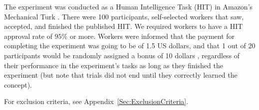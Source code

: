 The experiment was conducted as a Human Intelligence Task (HIT) in Amazon's Mechanical Turk \cite{crump2013evaluating, buhrmester2011amazon, stewart2015average}. %
There were 100 participants,  self-selected workers that saw, accepted, and finished the published HIT. We required workers to have a HIT approval rate of $95\%$ or more. %
Workers were informed that the payment for completing the experiment was going to be of {1.5} US dollars, 
and that 1 out of 20 participants would be randomly assigned a bonus of 10 dollars%
, regardless of their performance in the experiment's tasks %
as long as they finished the experiment (but note that trials did not end until they correctly learned the concept). %

For exclusion criteria, see Appendix~\ref{Sec:ExclusionCriteria}.



